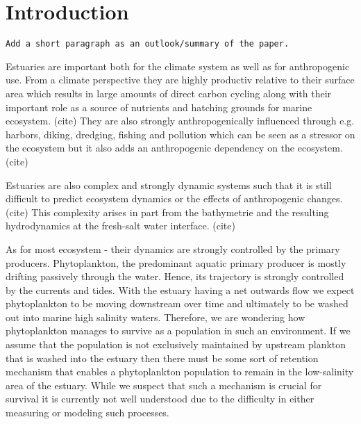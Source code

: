 
\section*{Introduction}


\texttt{Add a short paragraph as an outlook/summary of the paper.}

Estuaries are important both for the climate system as well as for anthropogenic use.
From a climate perspective they are highly productiv relative to their surface area 
which results in large amounts of direct carbon cycling 
along with their important role as a source of nutrients and hatching grounds for marine ecosystem. (cite)
They are also strongly anthropogenically influenced through e.g. harbors, diking, dredging, fishing and pollution which can be seen as a stressor on the ecosystem but it also adds an anthropogenic dependency on the ecosystem. (cite)

Estuaries are also complex and strongly dynamic systems such that it is still difficult to predict ecosystem dynamics or the effects of anthropogenic changes. (cite)
This complexity arises in part from the bathymetrie and the resulting hydrodynamics at the fresh-salt water interface. (cite)

As for most ecosystem - their dynamics are strongly controlled by the primary producers.
Phytoplankton, the 	predominant aquatic primary producer is mostly drifting passively through the water.
Hence, its trajectory is strongly controlled by the currents and tides.
With the estuary having a net outwards flow we expect phytoplankton to be moving
 downstream over time and ultimately to be washed out into marine high salinity waters.
Therefore, we are wondering how phytoplankton manages to survive as a population in such an environment.
If we assume that the population is not exclusively maintained by upstream plankton that is washed into the estuary
 then there must be some sort of retention mechanism that enables a phytoplankton population to remain in the low-salinity area of the estuary.
While we suspect that such a mechanism is crucial for survival it is currently not well understood 
due to the difficulty in either measuring or modeling such processes.



